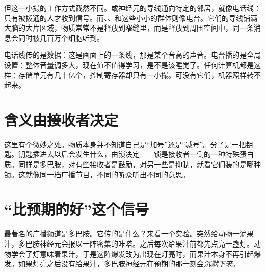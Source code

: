 但这一小撮的工作方式截然不同。或神经元的导线通向特定的邻居，就像电话线：只有被拨通的人才收到信号。而、、和这些小小的群体则像电台。它们的导线铺满大脑的大片区域，物质常常不是释放到窄缝里，而是释放到周围空间中，同一条消息会同时被几百万个细胞听到。

电话线传的是数据：这是画面上的一条线，那是某个音高的声音。电台播的是全局设置：整体音量调多大，现在值不值得学习，是不是该睡觉了。任何计算机都是这样：存储单元有几十亿个，控制寄存器却只有一小撮。可没有它们，机器照样转不起来。

\section*{含义由接收者决定}

这里有个微妙之处。物质本身并不知道自己是“加号”还是“减号”。分子是一把钥匙。钥匙插进去以后会发生什么，由锁决定——锁是接收者一侧的一种特殊蛋白质。同样是多巴胺，对有些接收者是鼓励，对另一些是抑制，就看它们装的是哪种锁。这就像同一档广播节目，不同的听众听出不同的意思。

\section*{“比预期的好”这个信号}

最著名的广播频道是多巴胺。它传的是什么？来看一个实验。突然给动物一滴果汁，多巴胺神经元会报以一阵密集的咔嗒。之后每次给果汁前都先点亮一盏灯。动物学会了灯意味着果汁，于是这阵爆发改为出现在灯亮时，而果汁本身不再引起爆发。如果灯亮之后没有给果汁，多巴胺神经元在预期的那一刻会\emph{沉默下来}。

